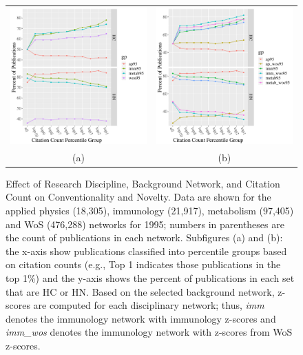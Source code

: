 \documentclass[11pt, oneside]{article}   	%
\begin{document}
\begin{figure}
\begin{tabular}{cc}
\includegraphics[width=3in]{fig1a.pdf} & \includegraphics[width=3in]{fig1b.pdf}
\\
(a) & (b)  \\
\end{tabular}
\caption{Effect of Research Discipline,  Background Network,  and Citation Count on Conventionality and Novelty.
Data are shown for the applied physics (18,305), immunology (21,917), metabolism (97,405) and WoS (476,288) networks for 1995; numbers in parentheses are the count of publications in each network.
Subfigures (a) and (b): the x-axis show publications classified into percentile groups based on citation counts (e.g., Top 1 indicates those publications in the top 1\%) and the y-axis shows the percent of publications in each set that are HC or HN.
Based on the selected background network, z-scores are computed for each disciplinary network; thus, \emph{imm} denotes the immunology network with immunology z-scores and \emph{imm\_wos} denotes the immunology network with z-scores from WoS z-scores.
}
\label{fig:Fig1}
\end{figure}
\newpage
\end{document}
